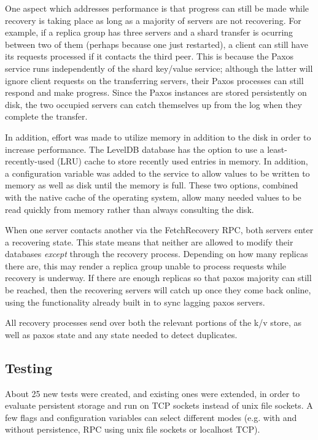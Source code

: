 \documentclass[letterpaper,10pt]{article}
\begin{document}
One aspect which addresses performance is that progress can still
be made while recovery is taking place as long as a majority of
servers are not recovering.  For example, if a replica group has
three servers and a shard transfer is ocurring between two of them
(perhaps because one just restarted), a client can still have its
requests processed if it contacts the third peer.  This is because
the Paxos service runs independently of the shard key/value
service; although the latter will ignore client requests on the
transferring servers, their Paxos processes can still respond and
make progress.  Since the Paxos instances are stored persistently
on disk, the two occupied servers can catch themselves up from the
log when they complete the transfer.

In addition, effort was made to utilize memory in addition to the
disk in order to increase performance.  The LevelDB database has
the option to use a least-recently-used (LRU) cache to store
recently used entries in memory.  In addition, a configuration
variable was added to the service to allow values to be written to
memory as well as disk until the memory is full.  These two
options, combined with the native cache of the operating system,
allow many needed values to be read quickly from memory rather than
always consulting the disk.

When one server contacts another via the FetchRecovery RPC, both
servers enter a recovering state. This state means that neither are
allowed to modify their databases \emph{except} through the
recovery process. Depending on how many replicas there are, this
may render a replica group unable to process requests while
recovery is underway.  If there are enough replicas so that paxos
majority can still be reached, then the recovering servers will
catch up once they come back online, using the functionality
already built in to sync lagging paxos servers.

All recovery processes send over both the relevant portions of the
k/v store, as well as paxos state and any state needed to detect
duplicates.



\subsection{Testing}
About 25 new tests were created, and existing ones were extended, in order to evaluate persistent storage and run on TCP sockets instead of unix file sockets.  A few flags and configuration variables can select different modes (e.g. with and without persistence, RPC using unix file sockets or localhost TCP).
\end{document}
